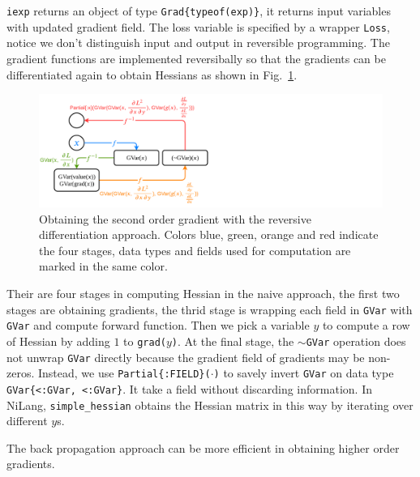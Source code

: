 \documentclass[aps,twocolumn,longbibliography,english,superscriptaddress,prr]{revtex4-1}
\newcommand{\<}{\langle}
\renewcommand{\>}{\rangle}
\newcommand{\Fig}[1]{Fig.~\ref{#1}}
\theoremstyle{definition}\newtheorem{definition}{\textit{Definition}}
\begin{document}
\texttt{iexp\textquotesingle} returns an object of type \texttt{Grad\{typeof(exp)\}}, it returns input variables with updated gradient field.
The loss variable is specified by a wrapper \texttt{Loss}, notice we don't distinguish input and output in reversible programming.
The gradient functions are implemented reversibally so that the gradients can be differentiated again to obtain Hessians as shown in \Fig{fig:simplehessian}.

\begin{figure}[h]
    \centerline{\includegraphics[width=0.9\columnwidth,trim={0 0cm 11cm 0cm},clip]{images/simplehessian.pdf}}
    \caption{Obtaining the second order gradient with the reversive differentiation approach. Colors blue, green, orange and red indicate the four stages, data types and fields used for computation are marked in the same color.}\label{fig:simplehessian}
\end{figure}

Their are four stages in computing Hessian in the naive approach, the first two stages are obtaining gradients, the thrid stage is wrapping each field in \texttt{GVar} with \texttt{GVar} and compute forward function. Then we pick a variable $y$ to compute a row of Hessian by adding $1$ to \texttt{grad($y$)}. At the final stage, the \texttt{$\sim$GVar} operation does not unwrap \texttt{GVar} directly because the gradient field of gradients may be non-zeros. Instead, we use \texttt{Partial\{:FIELD\}($\cdot$)} to savely invert \texttt{GVar} on data type \texttt{GVar\{<:GVar, <:GVar\}}. It take a field without discarding information. In NiLang, \texttt{simple\_hessian} obtains the Hessian matrix in this way by iterating over different $y$s.

The back propagation approach can be more efficient in obtaining higher order gradients.
\end{document}
